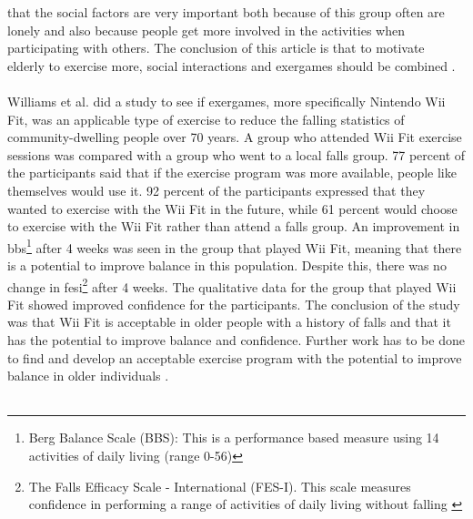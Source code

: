 that the social factors are very important  both because of this group often are lonely and also because people get more involved in the activities when participating with others. The conclusion of this article is that to motivate elderly to exercise more, social interactions and exergames should be combined \cite{exergamesforelderly}. \\ \\
Williams et al. \cite{excell} did a study to see if exergames, more specifically Nintendo Wii Fit, was an applicable type of exercise to reduce the falling statistics of community-dwelling people over 70 years. A group who attended Wii Fit exercise sessions was compared with a group who went to a local falls group. 77 percent of the participants said that if the exercise program was more available, people like themselves would use it. 92 percent of the participants expressed that they wanted to exercise with the Wii Fit in the future, while 61 percent would choose to exercise with the Wii Fit rather than attend a falls group. An improvement in \ac{bbs}\footnote{Berg Balance Scale (BBS): This is a performance based measure using 14 activities of daily living (range 0-56)\cite{excell}} after 4 weeks was seen in the group that played Wii Fit, meaning that there is a potential to improve balance in this population. Despite this, there was no change in \ac{fesi}\footnote{The Falls Efficacy Scale - International (FES-I). This scale measures confidence in performing a range of activities of daily living without falling \cite{fes}} after 4 weeks. The qualitative data for the group that played Wii Fit showed improved confidence for the participants. The conclusion of the study was that Wii Fit is acceptable in  older people with a history of falls and that it has the potential to improve balance and confidence. Further work has to be done to find and develop an acceptable exercise program with the potential to improve balance in older individuals \cite{excell}.\\ \\

